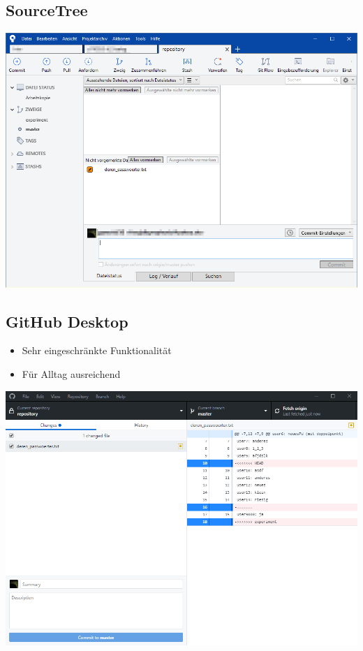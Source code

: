 \subsection{SourceTree}
\begin{frame}
\begin{center}
\includegraphics[scale=.4]{bilder/sourcetree.png}
\end{center}
\end{frame}

\subsection{GitHub Desktop}
\begin{frame}
\begin{itemize}
\item<2-> Sehr eingeschränkte Funktionalität
\item<3-> Für Alltag ausreichend
\end{itemize}
\end{frame}

\begin{frame}
\begin{center}
\includegraphics[scale=.4]{bilder/githubdesktop.png}
\end{center}
\end{frame}

